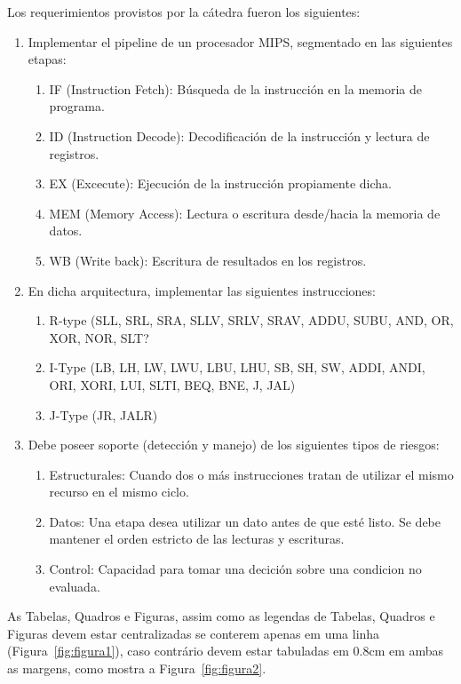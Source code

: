 \documentclass[12pt]{article}
\begin{document}
Los requerimientos provistos por la cátedra fueron los siguientes:

\begin{enumerate}
  \item Implementar el pipeline de un procesador MIPS, segmentado en las siguientes etapas:
  \begin{enumerate}
    \item IF (Instruction Fetch): Búsqueda de la instrucción en la memoria de programa.
    \item ID (Instruction Decode): Decodificación de la instrucción y lectura de registros.
    \item EX (Excecute): Ejecución de la instrucción propiamente dicha.
    \item MEM (Memory Access): Lectura o escritura desde/hacia la memoria de datos.
    \item WB (Write back): Escritura de resultados en los registros.
  \end{enumerate}
  \item En dicha arquitectura, implementar las siguientes instrucciones:
  \begin{enumerate}
    \item R-type (SLL, SRL, SRA, SLLV, SRLV, SRAV, ADDU, SUBU, AND, OR, XOR, NOR, SLT?
    \item I-Type (LB, LH, LW, LWU, LBU, LHU, SB, SH, SW, ADDI, ANDI, ORI, XORI, LUI, SLTI, BEQ, BNE, J, JAL)
    \item J-Type (JR, JALR)
  \end{enumerate}
  \item Debe poseer soporte (detección y manejo) de los siguientes tipos de riesgos:
  \begin{enumerate}
    \item Estructurales: Cuando dos o más instrucciones tratan de utilizar el mismo recurso en el mismo ciclo.
    \item Datos: Una etapa desea utilizar un dato antes de que esté listo. Se debe mantener el orden estricto de las lecturas y escrituras. 
    \item Control: Capacidad para tomar una decición sobre una condicion no evaluada.
  \end{enumerate}
\end{enumerate}

As Tabelas, Quadros e Figuras, assim como as legendas de Tabelas, Quadros e Figuras devem estar centralizadas se conterem apenas em uma linha (Figura~\ref{fig:figura1}), caso contrário devem estar tabuladas em 0.8cm em ambas as margens, como mostra a Figura~\ref{fig:figura2}. 
\end{document}
